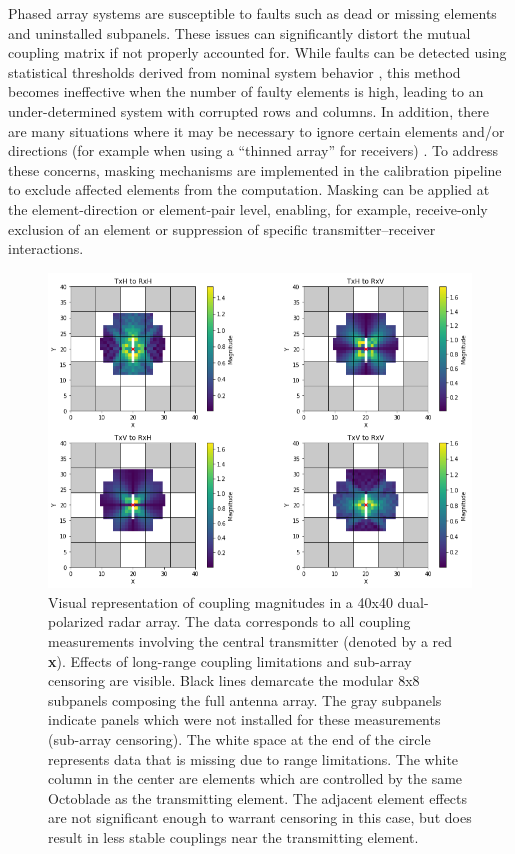 \documentclass[journal]{IEEEtran}
\begin{document}
Phased array systems are susceptible to faults such as dead or missing elements and uninstalled subpanels. These issues can significantly distort the mutual coupling matrix if not properly accounted for. While faults can be detected using statistical thresholds derived from nominal system behavior \cite{lebron,diagnostic}, this method becomes ineffective when the number of faulty elements is high, leading to an under-determined system with corrupted rows and columns. In addition, there are many situations where it may be necessary to ignore certain elements and/or directions (for example when using a ``thinned array'' for receivers) \cite{nickel}. To address these concerns, masking mechanisms are implemented in the calibration pipeline to exclude affected elements from the computation. Masking can be applied at the element-direction or element-pair level, enabling, for example, receive-only exclusion of an element or suppression of specific transmitter–receiver interactions. 

\begin{figure}[t]
    \centering
    \includegraphics[width=0.92\linewidth]{visualizedCouplingsFixed.png}
    \vspace{-0.2in}
    \caption{Visual representation of coupling magnitudes in a 40x40 dual-polarized radar array. The data corresponds to all coupling measurements involving the central transmitter (denoted by a red \textbf{x}). Effects of long-range coupling limitations and sub-array censoring are visible. Black lines demarcate the modular 8x8 subpanels composing the full antenna array. The gray subpanels indicate panels which were not installed for these measurements (sub-array censoring). The white space at the end of the circle represents data that is missing due to range limitations. The white column in the center are elements which are controlled by the same Octoblade as the transmitting element. The adjacent element effects are not significant enough to warrant censoring in this case, but does result in less stable couplings near the transmitting element.}
    \label{fig:visualizedCouplings}
\end{figure}
\end{document}
